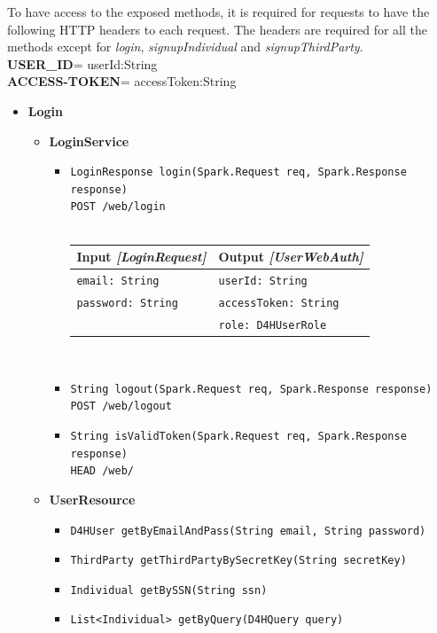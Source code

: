 \documentclass[a4paper, hidelinks, 12pt]{report}
\begin{document}
	To have access to the exposed methods, it is required for requests to have the following HTTP headers to each request. 	The headers are required for all the methods except for \textit{login},  \textit{signupIndividual} and \textit{signupThirdParty}.\\
	\textbf{USER\_ID}= userId:String \\
	\textbf{ACCESS-TOKEN}= accessToken:String \\

	\begin{itemize}
		\item{\textbf{Login}}
			\begin{itemize}
	\item{\textbf{LoginService}}
		\begin{itemize}
			\item{\verb|LoginResponse login(Spark.Request req, Spark.Response response)|\\ \verb|POST /web/login|}\\\\
			\begin{tabular}{l | l}
			\textbf{Input} \textit{[LoginRequest]} & \textbf{Output} \textit{[UserWebAuth]} \\
			\hline
			\verb|email: String| & \verb|userId: String| \\
			\verb|password: String| & \verb|accessToken: String| \\
			& \verb|role: D4HUserRole| 
			\end{tabular}\\
			
			\item{\verb|String logout(Spark.Request req, Spark.Response response)|\\ \verb|POST /web/logout|}
			\item{\verb|String isValidToken(Spark.Request req, Spark.Response response)|\\ \verb|HEAD /web/|}
			\end{itemize}
				
		\item{\textbf{UserResource}}
			\begin{itemize}
				\item{\verb|D4HUser getByEmailAndPass(String email, String password)|}
				\item{\verb|ThirdParty getThirdPartyBySecretKey(String secretKey)|}
				\item{\verb|Individual getBySSN(String ssn)|}
				\item{\verb|List<Individual> getByQuery(D4HQuery query)|}
			\end{itemize}
	  \end{itemize}
			

\end{itemize}
\end{document}
